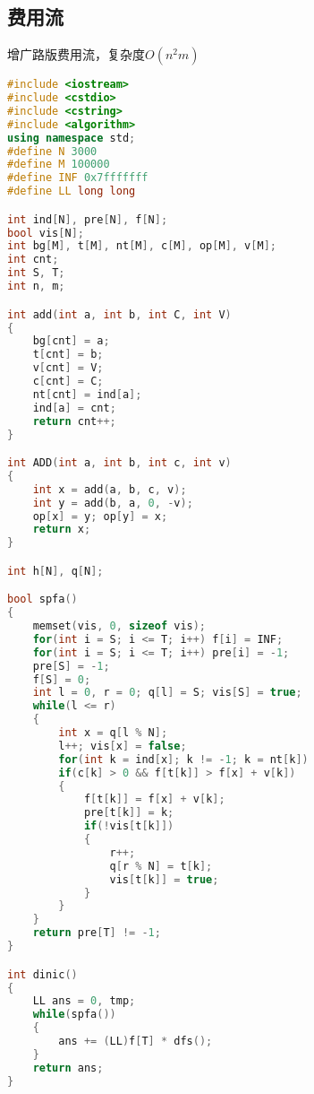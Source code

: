 ﻿\subsection{费用流}
	增广路版费用流，复杂度$ O(n^{2}m) $
    \begin{lstlisting}[language=C++]
#include <iostream>
#include <cstdio>
#include <cstring>
#include <algorithm>
using namespace std;
#define N 3000
#define M 100000
#define INF 0x7fffffff
#define LL long long

int ind[N], pre[N], f[N];
bool vis[N];
int bg[M], t[M], nt[M], c[M], op[M], v[M];
int cnt;
int S, T;
int n, m;

int add(int a, int b, int C, int V)
{
    bg[cnt] = a;
    t[cnt] = b;
    v[cnt] = V;
    c[cnt] = C;
    nt[cnt] = ind[a];
    ind[a] = cnt;
    return cnt++;
}

int ADD(int a, int b, int c, int v)
{
    int x = add(a, b, c, v);
    int y = add(b, a, 0, -v);
    op[x] = y; op[y] = x;
    return x;
}

int h[N], q[N];

bool spfa()
{
    memset(vis, 0, sizeof vis);
    for(int i = S; i <= T; i++) f[i] = INF;
    for(int i = S; i <= T; i++) pre[i] = -1;
    pre[S] = -1;
    f[S] = 0;
    int l = 0, r = 0; q[l] = S; vis[S] = true;
    while(l <= r)
    {
        int x = q[l % N];
        l++; vis[x] = false;
        for(int k = ind[x]; k != -1; k = nt[k])
        if(c[k] > 0 && f[t[k]] > f[x] + v[k])
        {
            f[t[k]] = f[x] + v[k];
            pre[t[k]] = k;
            if(!vis[t[k]])
            {
                r++;
                q[r % N] = t[k];
                vis[t[k]] = true;
            }
        }
    }
    return pre[T] != -1;
}

int dinic()
{
    LL ans = 0, tmp;
    while(spfa())
    {
        ans += (LL)f[T] * dfs();
    }
    return ans;
}    
    \end{lstlisting}